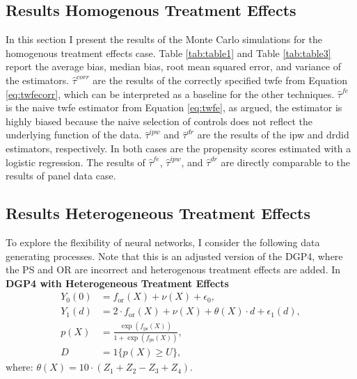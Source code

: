 \subsection{Results Homogenous Treatment Effects}



In this section I present the results of the Monte Carlo simulations for the homogenous treatment effects case.
Table \ref{tab:table1} and Table \ref{tab:table3} report the average bias, median bias, root mean squared error, and variance of the estimators.
$\hat{\tau}^{corr}$ are the results of the correctly specified \ac{twfe} from Equation \ref{eq:twfecorr}, which can be interpreted as a baseline for the other techniques.
$\hat{\tau}^{fe}$ is the naive \ac{twfe} estimator from Equation \ref{eq:twfe}, as argued, the estimator is highly biased because the naive selection of controls does not reflect the underlying function of the data.
$\hat{\tau}^{ipw}$ and $\hat{\tau}^{dr}$ are the results of the \ac{ipw} and \ac{drdid} estimators, respectively.
In both cases are the propensity scores estimated with a logistic regression.
The results of $\hat{\tau}^{fe}$, $\hat{\tau}^{ipw}$, and $\hat{\tau}^{dr}$ are directly comparable to the results of \citet{santannaDoublyRobustDifferenceindifferences2020} panel data case.




\subsection{Results Heterogeneous Treatment Effects}
To explore the flexibility of neural networks, I consider the following data generating processes. Note that this is an adjusted version of the DGP4, where the PS and OR are incorrect and heterogenous treatment effects are added. In \\
\textbf{DGP4 with Heterogeneous Treatment Effects}
\begin{align*}
    Y_0(0) &= f_{\text{or}}(X) + \nu(X) + \epsilon_0, \\
    Y_1(d) &= 2 \cdot f_{\text{or}}(X) + \nu(X) + \theta(X) \cdot d + \epsilon_1(d), \\
    p(X) &= \frac{\exp \left( f_{\text{ps}}(X) \right)}{1 + \exp \left( f_{\text{ps}}(X) \right)}, \\
    D &= 1\{ p(X) \geq U \},
\end{align*}
where: $\theta(X) = 10 \cdot (Z_1 + Z_2 - Z_3 + Z_4)$.



